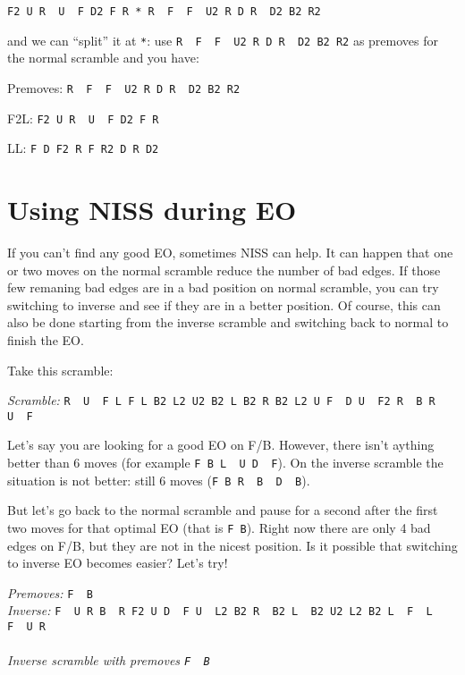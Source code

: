 \documentclass[11pt,a4paper]{book}
\newcommand{\p}{\textquotesingle}
\newcommand{\m}{\texttt}
\newcommand{\ps}{\p\,\,}
\begin{document}
\begin{center}
\m{F2 U R\ps U\ps F D2 F R * R\ps F\ps F\ps U2 R D R\ps D2 B2 R2}
\end{center}

and we can ``split'' it at \m{*}: use \m{R\ps F\ps F\ps U2 R D R\ps D2 B2 R2} as premoves for the normal scramble and you have:

\bigskip
Premoves: \m{R\ps F\ps F\ps U2 R D R\ps D2 B2 R2}

F2L: \m{F2 U R\ps U\ps F D2 F R}

LL: \m{F D F2 R F R2 D R D2}

\section{Using NISS during EO}
\label{sec:NISSEO}

If you can't find any good EO, sometimes NISS can help. It can happen that one or two moves on the normal scramble reduce the number of bad edges. If those few remaning bad edges are in a bad position on normal scramble, you can try switching to inverse and see if they are in a better position. Of course, this can also be done starting from the inverse scramble and switching back to normal to finish the EO.

Take this scramble:
\begin{center}
\emph{Scramble:} \m{R\ps U\ps F L F L B2 L2 U2 B2 L B2 R B2 L2 U F\ps D U\ps F2 R\ps B R\ps U\ps F}\\

\end{center}
Let's say you are looking for a good EO on F/B. However, there isn't aything better than 6 moves (for example \m{F B L\ps U D\ps F}). On the inverse scramble the situation is not better: still 6 moves (\m{F B R\ps B\ps D\ps B}).

But let's go back to the normal scramble and pause for a second after the first two moves for that optimal EO (that is \m{F B}). Right now there are only 4 bad edges on F/B, but they are not in the nicest position. Is it possible that switching to inverse EO becomes easier? Let's try!

\begin{center}
\emph{Premoves:} \m{F\ps B\p}\\
\emph{Inverse:} \m{F\ps U R B\ps R F2 U D\ps F U\ps L2 B2 R\ps B2 L\ps B2 U2 L2 B2 L\ps F\ps L\ps F\ps U R}\\
\\
\emph{Inverse scramble with premoves \m{F\ps B\p}}
\end{center}
\end{document}
